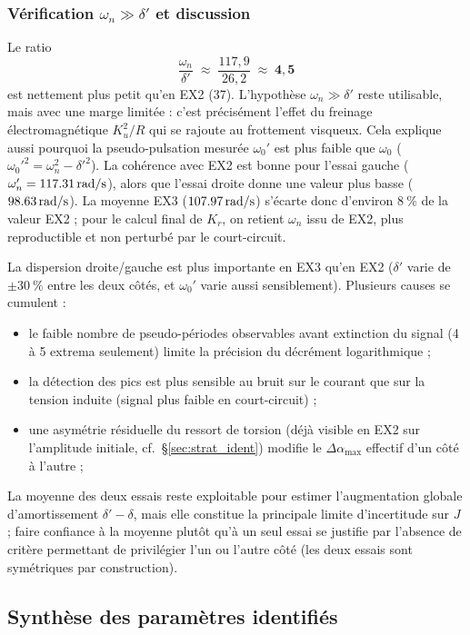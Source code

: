 \subsubsection{Vérification \texorpdfstring{\(\omega_n \gg \delta'\)}{wn >> delta prime} et discussion}

Le ratio
\[
\frac{\omega_n}{\delta'} \;\approx\; \frac{117{,}9}{26{,}2} \;\approx\; \mathbf{4{,}5}
\]
est nettement plus petit qu'en EX2 (37). L'hypothèse \(\omega_n \gg \delta'\) reste utilisable, mais avec une marge limitée : c'est précisément l'effet du freinage électromagnétique \(K_u^2/R\) qui se rajoute au frottement visqueux. Cela explique aussi pourquoi la pseudo-pulsation mesurée \(\omega_0'\) est plus faible que \(\omega_0\) (\(\omega_0'^2 = \omega_n^2 - \delta'^2\)). La cohérence avec EX2 est bonne pour l'essai gauche (\(\omega_n'=\SI{117{,}31}{rad/s}\)), alors que l'essai droite donne une valeur plus basse (\(\SI{98{,}63}{rad/s}\)). La moyenne EX3 (\(\SI{107{,}97}{rad/s}\)) s'écarte donc d'environ \(\SI{8}{\%}\) de la valeur EX2 ; pour le calcul final de \(K_r\), on retient \(\omega_n\) issu de EX2, plus reproductible et non perturbé par le court-circuit.

La dispersion droite/gauche est plus importante en EX3 qu'en EX2 (\(\delta'\) varie de \(\pm\!\SI{30}{\%}\) entre les deux côtés, et \(\omega_0'\) varie aussi sensiblement). Plusieurs causes se cumulent :
\begin{itemize}
    \item le faible nombre de pseudo-périodes observables avant extinction du signal (4 à 5 extrema seulement) limite la précision du décrément logarithmique ;
    \item la détection des pics est plus sensible au bruit sur le courant que sur la tension induite (signal plus faible en court-circuit) ;
    \item une asymétrie résiduelle du ressort de torsion (déjà visible en EX2 sur l'amplitude initiale, cf.\ §\ref{sec:strat_ident}) modifie le \(\Delta\alpha_{\max}\) effectif d'un côté à l'autre ;
\end{itemize}
La moyenne des deux essais reste exploitable pour estimer l'augmentation globale d'amortissement \(\delta'-\delta\), mais elle constitue la principale limite d'incertitude sur \(J\) ; faire confiance à la moyenne plutôt qu'à un seul essai se justifie par l'absence de critère permettant de privilégier l'un ou l'autre côté (les deux essais sont symétriques par construction).

\newpage
\subsection{Synthèse des paramètres identifiés}
\label{sec:synthese}

